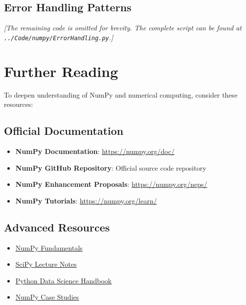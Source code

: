 \subsection{Error Handling Patterns}
\label{subsec:error_patterns}



\noindent\textit{[The remaining code is omitted for brevity. The complete script can be found at \texttt{../Code/numpy/ErrorHandling.py}.]}

\section{Further Reading}
\label{sec:further_reading}

To deepen understanding of NumPy and numerical computing, consider these resources:

\subsection{Official Documentation}
\begin{itemize}
	\item \textbf{NumPy Documentation}: \url{https://numpy.org/doc/}
	\item \textbf{NumPy GitHub Repository}: Official source code repository \cite{NumPy:2024}
	\item \textbf{NumPy Enhancement Proposals}: \url{https://numpy.org/neps/}
	\item \textbf{NumPy Tutorials}: \url{https://numpy.org/learn/}
\end{itemize}

\subsection{Advanced Resources}
\begin{itemize}
	\item \href{https://numpy.org/devdocs/user/basics.html}{NumPy Fundamentals}
	\item \href{https://scipy-lectures.org/}{SciPy Lecture Notes}
	\item \href{https://jakevdp.github.io/PythonDataScienceHandbook/}{Python Data Science Handbook} \cite{VanderPlas:2023}
	\item \href{https://numpy.org/case-studies/}{NumPy Case Studies}
\end{itemize}

